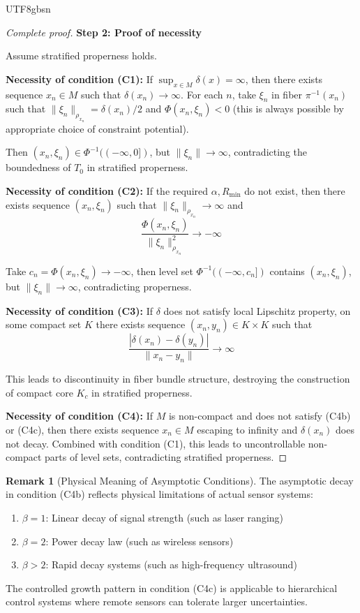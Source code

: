 \documentclass[a4paper,12pt]{extarticle}
\theoremstyle{definition}
\newtheorem{remark}{Remark}
\begin{document}
\begin{CJK}{UTF8}{gbsn}
\begin{proof}[Complete proof]
\textbf{Step 2: Proof of necessity}

Assume stratified properness holds.

\textbf{Necessity of condition (C1):}
If $\sup_{x \in M} \delta(x) = \infty$, then there exists sequence $x_n \in M$ such that $\delta(x_n) \to \infty$. For each $n$, take $\xi_n$ in fiber $\pi^{-1}(x_n)$ such that $\|\xi_n\|_{\rho_{x_n}} = \delta(x_n)/2$ and $\Phi(x_n, \xi_n) < 0$ (this is always possible by appropriate choice of constraint potential).

Then $(x_n, \xi_n) \in \Phi^{-1}((-\infty, 0])$, but $\|\xi_n\| \to \infty$, contradicting the boundedness of $T_0$ in stratified properness.

\textbf{Necessity of condition (C2):}
If the required $\alpha, R_{\min}$ do not exist, then there exists sequence $(x_n, \xi_n)$ such that $\|\xi_n\|_{\rho_{x_n}} \to \infty$ and
$$\frac{\Phi(x_n, \xi_n)}{\|\xi_n\|_{\rho_{x_n}}^2} \to -\infty$$

Take $c_n = \Phi(x_n, \xi_n) \to -\infty$, then level set $\Phi^{-1}((-\infty, c_n])$ contains $(x_n, \xi_n)$, but $\|\xi_n\| \to \infty$, contradicting properness.

\textbf{Necessity of condition (C3):}
If $\delta$ does not satisfy local Lipschitz property, on some compact set $K$ there exists sequence $(x_n, y_n) \in K \times K$ such that
$$\frac{|\delta(x_n) - \delta(y_n)|}{\|x_n - y_n\|} \to \infty$$

This leads to discontinuity in fiber bundle structure, destroying the construction of compact core $K_c$ in stratified properness.

\textbf{Necessity of condition (C4):}
If $M$ is non-compact and does not satisfy (C4b) or (C4c), then there exists sequence $x_n \in M$ escaping to infinity and $\delta(x_n)$ does not decay. Combined with condition (C1), this leads to uncontrollable non-compact parts of level sets, contradicting stratified properness.
\end{proof}


\begin{remark}[Physical Meaning of Asymptotic Conditions]
The asymptotic decay in condition (C4b) reflects physical limitations of actual sensor systems:
\begin{enumerate}
\item $\beta = 1$: Linear decay of signal strength (such as laser ranging)
\item $\beta = 2$: Power decay law (such as wireless sensors)
\item $\beta > 2$: Rapid decay systems (such as high-frequency ultrasound)
\end{enumerate}
The controlled growth pattern in condition (C4c) is applicable to hierarchical control systems where remote sensors can tolerate larger uncertainties.
\end{remark}






\end{CJK}
\end{document}
